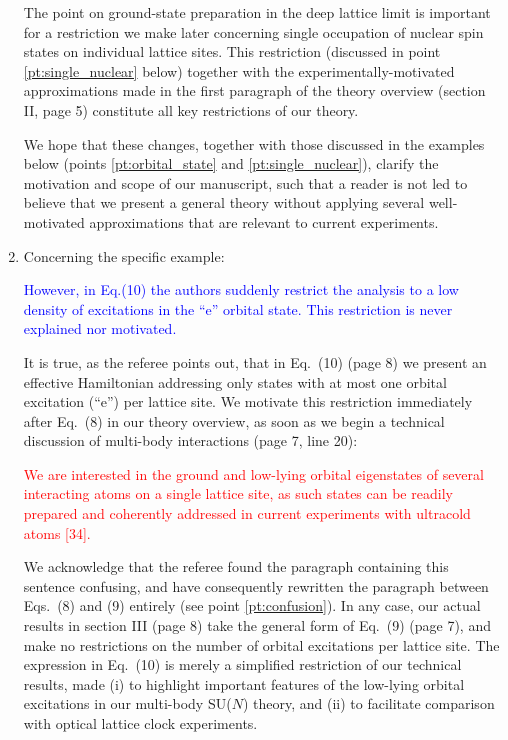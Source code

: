 \documentclass[preprint]{revtex4-1}
\newcommand{\1}{\mathds{1}}
\newcommand{\blue}[1]{\textcolor{blue}{#1}}
\newcommand{\red}[1]{\textcolor{red}{#1}}
\begin{document}
\begin{enumerate}
  The point on ground-state preparation in the deep lattice limit is
  important for a restriction we make later concerning single
  occupation of nuclear spin states on individual lattice sites.  This
  restriction (discussed in point \ref{pt:single_nuclear} below)
  together with the experimentally-motivated approximations made in
  the first paragraph of the theory overview (section II, page 5)
  constitute all key restrictions of our theory.

  We hope that these changes, together with those discussed in the
  examples below (points \ref{pt:orbital_state} and
  \ref{pt:single_nuclear}), clarify the motivation and scope of our
  manuscript, such that a reader is not led to believe that we present
  a general theory without applying several well-motivated
  approximations that are relevant to current experiments.


\item Concerning the specific example:

  \blue{However, in Eq.(10) the authors suddenly restrict the analysis
    to a low density of excitations in the ``e'' orbital state. This
    restriction is never explained nor motivated.}

  \label{pt:orbital_state}

  It is true, as the referee points out, that in Eq.~(10) (page 8) we
  present an effective Hamiltonian addressing only states with at most
  one orbital excitation (``e'') per lattice site.  We motivate this
  restriction immediately after Eq.~(8) in our theory overview, as
  soon as we begin a technical discussion of multi-body interactions
  (page 7, line 20):

  \red{We are interested in the ground and low-lying orbital
    eigenstates of several interacting atoms on a single lattice site,
    as such states can be readily prepared and coherently addressed in
    current experiments with ultracold atoms [34].}

  We acknowledge that the referee found the paragraph containing this
  sentence confusing, and have consequently rewritten the paragraph
  between Eqs.~(8) and (9) entirely (see point \ref{pt:confusion}).
  In any case, our actual results in section III (page 8) take the
  general form of Eq.~(9) (page 7), and make no restrictions on the
  number of orbital excitations per lattice site.  The expression in
  Eq.~(10) is merely a simplified restriction of our technical
  results, made (i) to highlight important features of the low-lying
  orbital excitations in our multi-body SU($N$) theory, and (ii) to
  facilitate comparison with optical lattice clock experiments.


\end{enumerate}
\end{document}
